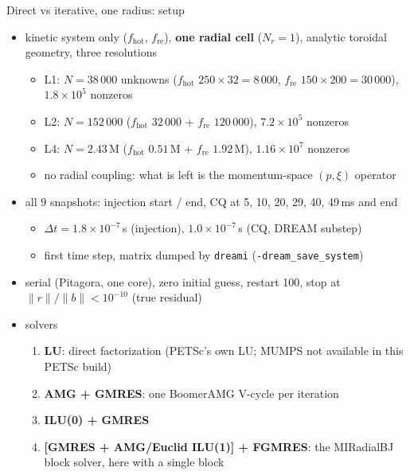 \begin{frame}{Direct vs iterative, one radius: setup}
    \footnotesize
    \begin{itemize}
        \item kinetic system only ($f_\mathrm{hot}$, $f_\mathrm{re}$), \textbf{one radial cell} ($N_r = 1$),
              analytic toroidal geometry, three resolutions
        \begin{itemize}
            \item L1: $N = 38\,000$ unknowns ($f_\mathrm{hot}$ $250 \times 32 = 8\,000$,
                  $f_\mathrm{re}$ $150 \times 200 = 30\,000$), $1.8\times10^{5}$ nonzeros
            \item L2: $N = 152\,000$ ($f_\mathrm{hot}$ $32\,000$ + $f_\mathrm{re}$ $120\,000$),
                  $7.2\times10^{5}$ nonzeros
            \item L4: $N = 2.43$\,M ($f_\mathrm{hot}$ $0.51$\,M + $f_\mathrm{re}$ $1.92$\,M),
                  $1.16\times10^{7}$ nonzeros
            \item no radial coupling: what is left is the momentum-space $(p, \xi)$ operator
        \end{itemize}
        \item all 9 snapshots: injection start / end, CQ at 5, 10, 20, 29, 40, 49\,ms and end
        \begin{itemize}
            \item $\Delta t = 1.8\times10^{-7}$\,s (injection), $1.0\times10^{-7}$\,s (CQ, DREAM substep)
            \item first time step, matrix dumped by \texttt{dreami} (\texttt{-dream\_save\_system})
        \end{itemize}
        \item serial (Pitagora, one core), zero initial guess, restart 100,
              stop at $\|r\|/\|b\| < 10^{-10}$ (true residual)
        \item solvers
        \begin{enumerate}
            \item \textbf{LU}: direct factorization (PETSc's own LU; MUMPS not available in this PETSc build)
            \item \textbf{AMG + GMRES}: one BoomerAMG V-cycle per iteration
            \item \textbf{ILU(0) + GMRES}
            \item \textbf{[GMRES + AMG/Euclid ILU(1)] + FGMRES}: the MIRadialBJ block solver, here with a single block
        \end{enumerate}
    \end{itemize}
\end{frame}

